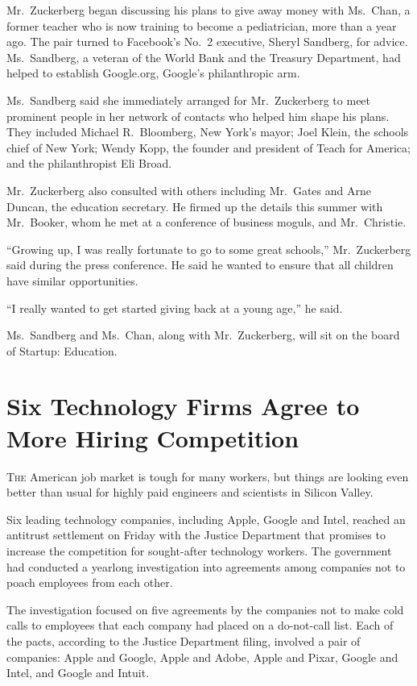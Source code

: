 ﻿\documentclass[12pt]{article}
\begin{document}
Mr.~Zuckerberg began discussing his plans to give away money with Ms.~Chan, a former teacher who is
now training to become a pediatrician, more than a year ago. The pair turned to Facebook's No.~2
executive, Sheryl Sandberg, for advice. Ms.~Sandberg, a veteran of the World Bank and the Treasury
Department, had helped to establish Google.org, Google's philanthropic arm.

Ms.~Sandberg said she immediately arranged for Mr.~Zuckerberg to meet prominent people in her
network of contacts who helped him shape his plans. They included Michael R.~Bloomberg, New York's
mayor; Joel Klein, the schools chief of New York; Wendy Kopp, the founder and president of Teach for
America; and the philanthropist Eli Broad.

Mr.~Zuckerberg also consulted with others including Mr.~Gates and Arne Duncan, the education
secretary. He firmed up the details this summer with Mr.~Booker, whom he met at a conference of
business moguls, and Mr.~Christie.

``Growing up, I was really fortunate to go to some great schools,'' Mr.~Zuckerberg said during the
press conference. He said he wanted to ensure that all children have similar opportunities.

``I really wanted to get started giving back at a young age,'' he said.

Ms.~Sandberg and Ms.~Chan, along with Mr.~Zuckerberg, will sit on the board of Startup: Education.

\pagebreak
\section{Six Technology Firms Agree to More Hiring Competition}

\lettrine{T}{he} American job market is tough for many workers, but things
are looking even better than usual for highly paid engineers and scientists in Silicon Valley.

Six leading technology companies, including Apple, Google and Intel, reached an antitrust settlement
on Friday with the Justice Department that promises to increase the competition for sought-after
technology workers. The government had conducted a yearlong investigation into agreements among
companies not to poach employees from each other.

The investigation focused on five agreements by the companies not to make cold calls to employees
that each company had placed on a do-not-call list. Each of the pacts, according to the Justice
Department filing, involved a pair of companies: Apple and Google, Apple and Adobe, Apple and Pixar,
Google and Intel, and Google and Intuit.
\end{document}
